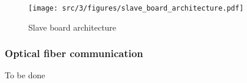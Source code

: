 \begin{figure}[!h]
  \centering
  \texttt{[image: src/3/figures/slave\_board\_architecture.pdf]}
  \caption{Slave board architecture}
  \label{fig:slave-board-architecture}
\end{figure}


\subsubsection{Optical fiber communication}


To be done
